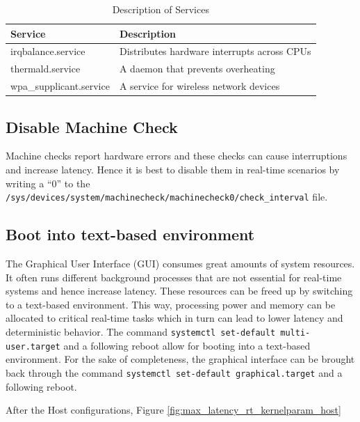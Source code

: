 \documentclass[MMR,Master,english]{twbook}
\begin{document}
\begin{table}[H]
	\centering
	\caption{Description of Services}
	\label{tab:stop_servies}
	\setlength{\tabcolsep}{0.5em} %
	{\renewcommand{\arraystretch}{1.2}%
	\begin{tabular}{|l|l|}
	\hline
	\textbf{Service} & \textbf{Description} \\
	\hline
	irqbalance.service & Distributes hardware interrupts across CPUs \\\hline
	thermald.service & A daemon that prevents overheating \\\hline
	wpa\_supplicant.service & A service for wireless network devices \\
	\hline
	\end{tabular}}
	\end{table}
\subsection{Disable Machine Check}
Machine checks report hardware errors and these checks can cause interruptions and increase latency. Hence it is best to disable them in real-time scenarios by writing a ``0'' to the \texttt{/sys/devices/system/machinecheck/machinecheck0/check\_interval} file.

\subsection{Boot into text-based environment}
The Graphical User Interface (GUI) consumes great amounts of system resources. It often runs different background processes that are not essential for real-time systems and hence increase latency. These resources can be freed up by switching to a text-based environment. This way, processing power and memory can be allocated to critical real-time tasks which in turn can lead to lower latency and deterministic behavior. The command \texttt{systemctl set-default multi-user.target} and a following reboot allow for booting into a text-based environment. For the sake of completeness, the graphical interface can be brought back through the command \texttt{systemctl set-default graphical.target} and a following reboot.

After the Host configurations, Figure \ref{fig:max_latency_rt_kernelparam_host}
\end{document}
